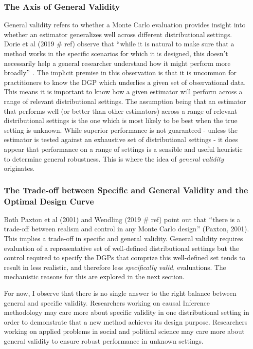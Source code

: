 \documentclass[../main.tex]{subfiles}
\begin{document}
\subsubsection{The Axis of General Validity}

General validity refers to whether a Monte Carlo evaluation provides insight into whether an estimator generalizes well across different distributional settings. Dorie et al (2019 $\#$ ref) observe that $``$while it is natural to make sure that a method works in the specific scenarios for which it is designed, this doesn’t necessarily help a general researcher understand how it might perform more broadly$"$ . The implicit premise in this observation is that it is uncommon for practitioners to know the DGP which underlies a given set of observational data. This means it is important to know how a given estimator will perform across a range of relevant distributional settings. The assumption being that an estimator that performs well (or better than other estimators) across a range of relevant distributional settings is the one which is most likely to be best when the true setting is unknown. While superior performance is not guaranteed - unless the estimator is tested against an exhaustive set of distributional settings - it does appear that performance on a range of settings is a sensible and useful heuristic to determine general robustness. This is where the idea of \textit{general validity }originates.\par

\subsubsection{The Trade-off between Specific and General Validity and the Optimal Design Curve}

Both Paxton et al (2001) and Wendling (2019 $\#$ ref) point out that $``$there is a trade-off between realism and control in any Monte Carlo design$"$  (Paxton, 2001). This implies a trade-off in specific and general validity. General validity requires evaluation of a representative set of well-defined distributional settings but the control required to specify the DGPs that comprize this well-defined set tends to result in less realistic, and therefore less \textit{specifically valid}, evaluations. The mechanistic reasons for this are explored in the next section.\par


\vspace{\baselineskip}
For now, I observe that there is no single answer to the right balance between general and specific validity. Researchers working on causal Inference methodology may care more about specific validity in one distributional setting in order to demonstrate that a new method achieves its design purpose. Researchers working on applied problems in social and political science may care more about general validity to ensure robust performance in unknown settings.\par
\end{document}
